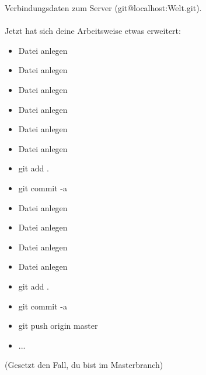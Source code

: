 \documentclass[german,a4paper]{report}
\begin{document}
Verbindungsdaten zum Server (git@localhost:Welt.git).\\
\\
Jetzt hat sich deine Arbeitsweise etwas erweitert:
\begin{itemize}
\item Datei anlegen
\item Datei anlegen
\item Datei anlegen
\item Datei anlegen
\item Datei anlegen
\item Datei anlegen
\item git add .
\item git commit -a
\item Datei anlegen
\item Datei anlegen
\item Datei anlegen
\item Datei anlegen
\item git add .
\item git commit -a
\item git push origin master
\item ...
\end{itemize}
(Gesetzt den Fall, du bist im Masterbranch)
\end{document}
